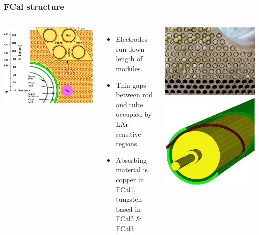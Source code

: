 \documentclass[10pt]{beamer}
\begin{document}
\begin{frame} 
\frametitle{FCal structure} 
\begin{columns}
\includegraphics[width=0.8\linewidth,angle=0]{fcalfrontclose2.eps}\\
\begin{itemize}
\item Electrodes run down length of modules.
\item Thin gaps between rod and tube occupied by LAr, sensitive regions.
\item Absorbing material is copper in FCal1, tungsten based in FCal2 \& FCal3
\end{itemize}
\includegraphics[width=0.5\linewidth,angle=0]{FCal1_face.eps}\\
\includegraphics[width=0.5\linewidth,angle=0]{FCal_electrode.eps}\\

\end{columns}
\end{frame}
\end{document}
